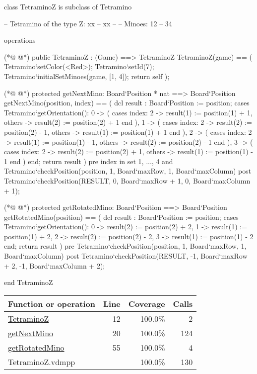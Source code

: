 \begin{vdmpp}[breaklines=true]
class TetraminoZ is subclass of Tetramino
  
 -- Tetramino of the type Z: xx
 --        xx
 --
 -- Minoes:      12
 --          34
 

 operations
 
(*@
\label{TetraminoZ:12}
@*)
  public TetraminoZ : (Game) ==> TetraminoZ
  TetraminoZ(game) == (
   Tetramino`setColor(<Red>);
   Tetramino`setId(7);
   Tetramino`initialSetMinoes(game, [1, 4]);
   return self
  );

(*@
\label{getNextMino:20}
@*)
  protected getNextMino: Board`Position * nat ==> Board`Position
  getNextMino(position, index) == (
   dcl result : Board`Position := position;
   cases Tetramino`getOrientation():
    0 -> (
     cases index:
      2 -> result(1) := position(1) + 1,
      others -> result(2) := position(2) + 1
     end
    ),
    1 -> (
     cases index:
      2 -> result(2) := position(2) - 1,
      others -> result(1) := position(1) + 1
     end
    ),
    2 -> (
     cases index:
      2 -> result(1) := position(1) - 1,
      others -> result(2) := position(2) - 1
     end
    ),
    3 -> (
     cases index:
      2 -> result(2) := position(2) + 1,
      others -> result(1) := position(1) - 1
     end
    )
   end;
   return result
  )
  pre index in set {1, ..., 4} 
   and Tetramino`checkPosition(position, 1, Board`maxRow, 1, Board`maxColumn)
  post Tetramino`checkPosition(RESULT, 0, Board`maxRow + 1, 0, Board`maxColumn + 1);
   
(*@
\label{getRotatedMino:55}
@*)
  protected getRotatedMino: Board`Position ==> Board`Position
  getRotatedMino(position) == (
   dcl result : Board`Position := position;
   cases Tetramino`getOrientation():
    0 -> result(2) := position(2) + 2,
    1 -> result(1) := position(1) + 2,
    2 -> result(2) := position(2) - 2,
    3 -> result(1) := position(1) - 2
   end;
   return result
  )
  pre Tetramino`checkPosition(position, 1, Board`maxRow, 1, Board`maxColumn)
  post Tetramino`checkPosition(RESULT, -1, Board`maxRow + 2, -1, Board`maxColumn + 2);

end TetraminoZ
\end{vdmpp}
\bigskip
\begin{longtable}{|l|r|r|r|}
\hline
Function or operation & Line & Coverage & Calls \\
\hline
\hline
\hyperref[TetraminoZ:12]{TetraminoZ} & 12&100.0\% & 2 \\
\hline
\hyperref[getNextMino:20]{getNextMino} & 20&100.0\% & 124 \\
\hline
\hyperref[getRotatedMino:55]{getRotatedMino} & 55&100.0\% & 4 \\
\hline
\hline
TetraminoZ.vdmpp & & 100.0\% & 130 \\
\hline
\end{longtable}

